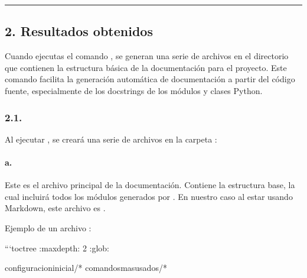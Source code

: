 \documentclass[a4paper,10pt,spanish]{sphinxmanual}
\begin{document}
\bigskip\hrule\bigskip



\subsection{2. Resultados obtenidos}
\label{\detokenize{configuracion_inicial/007.Creacion_de_ficheros_de_codigo_y_generacion_automatica_de_documentacion:resultados-obtenidos}}
\sphinxAtStartPar
Cuando ejecutas el comando , se generan una serie de archivos en el directorio  que contienen la estructura básica de la documentación para el proyecto. Este comando facilita la generación automática de documentación a partir del código fuente, especialmente de los docstrings de los módulos y clases Python.


\subsubsection{2.1. }
\label{\detokenize{configuracion_inicial/007.Creacion_de_ficheros_de_codigo_y_generacion_automatica_de_documentacion:estructura-de-archivos-generada}}
\sphinxAtStartPar
Al ejecutar , se creará una serie de archivos en la carpeta :


\paragraph{a. }
\label{\detokenize{configuracion_inicial/007.Creacion_de_ficheros_de_codigo_y_generacion_automatica_de_documentacion:a-index-rst-o-index-md}}
\sphinxAtStartPar
Este es el archivo principal de la documentación. Contiene la estructura base, la cual incluirá todos los módulos generados por . En nuestro caso al estar usando Markdown, este archivo es .

\sphinxAtStartPar
Ejemplo de un archivo :

\begin{sphinxVerbatim}[commandchars=\\\{\}]


```\PYGZob{}toctree\PYGZcb{}
:maxdepth: 2
:glob:

configuracion\PYGZus{}inicial/*
comandos\PYGZus{}mas\PYGZus{}usados/*
\end{sphinxVerbatim}
\end{document}
